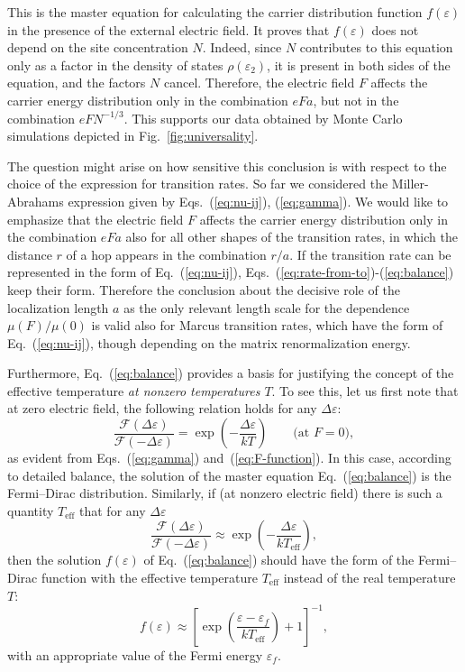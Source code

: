 \documentclass[aps,reprint,amsmath,amssymb,superscriptaddress,showpacs,prb]{revtex4-1}
\newcommand{\ve}{\varepsilon}
\renewcommand{\alpha}{ a }
\begin{document}
This is the master equation for calculating the carrier distribution function $f(\ve)$ in the presence of the external electric field. It proves that $f(\ve)$ does not depend on the site concentration $N$. Indeed, since $N$ contributes to this equation only as a factor in the density of states $\rho(\ve_2)$, it is present in both sides of the equation, and the factors $N$ cancel. Therefore, the electric field $F$ affects the carrier energy distribution only in the combination $eF\alpha$, but not in the combination $eFN^{-1/3}$. This supports our data obtained by Monte Carlo simulations depicted in Fig.~\ref{fig:universality}.

The question might arise on how sensitive this conclusion is with respect to the choice of the expression for transition rates. So far we considered the Miller-Abrahams expression given by Eqs.~(\ref{eq:nu-ij}), (\ref{eq:gamma}). We would like to emphasize that the electric field $F$ affects the carrier energy distribution only in the combination $eF\alpha$ also for all other shapes of the transition rates, in which the distance $r$ of a hop appears in the combination $r/\alpha$. If the transition rate can be represented in the form of Eq.~(\ref{eq:nu-ij}), Eqs.~(\ref{eq:rate-from-to})-(\ref{eq:balance}) keep their form. Therefore the conclusion about the decisive role of the localization length $\alpha$ as the only relevant length scale for the dependence $\mu(F)/\mu(0)$ is valid also for Marcus transition rates, which have the form of Eq.~(\ref{eq:nu-ij}), though depending on the matrix renormalization energy\cite{Marcus1964}.

Furthermore, Eq.~(\ref{eq:balance}) provides a basis for justifying the concept of the effective temperature \emph{at nonzero temperatures $T$}. To see this, let us first note that at zero electric field, the following relation holds for any $\Delta\ve$:
\begin{equation}
	\label{eq:ratio-F-no-field}
	\frac {\mathcal{F}(\Delta\ve)} {\mathcal{F}(-\Delta\ve)} = \exp\left( -\frac{\Delta\ve}{kT} \right)  \qquad \text{(at $F=0$)} ,
\end{equation}
as evident from Eqs.~(\ref{eq:gamma}) and~(\ref{eq:F-function}). In this case, according to detailed balance, the solution of the master equation Eq.~(\ref{eq:balance}) is the Fermi--Dirac distribution. Similarly, if (at nonzero electric field) there is such a quantity $T_{\text{eff}}$ that for any $\Delta\ve$
\begin{equation}
	\label{eq:ratio-F-Teff}
	\frac {\mathcal{F}(\Delta\ve)} {\mathcal{F}(-\Delta\ve)} \approx \exp\left( -\frac{\Delta\ve}{kT_{\text{eff}}} \right) ,
\end{equation}
then the solution $f(\ve)$ of Eq.~(\ref{eq:balance}) should have the form of the Fermi--Dirac function with the effective temperature $T_{\text{eff}}$ instead of the real temperature $T$:
\begin{equation}
	\label{eq:Fermi-Teff}
	f(\ve) \approx \left[ \exp\left( \frac{\ve-\ve_f}{kT_{\text{eff}}} \right) + 1 \right]^{-1} ,
\end{equation}
with an appropriate value of the Fermi energy $\ve_f$.
\end{document}
